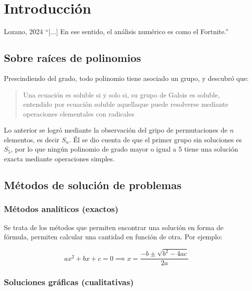 \chapter{Introducción}

\begin{chapquote}{Lozano, 2024}
    ``[...] En ese sentido, el análisis numérico es como el Fortnite.''
\end{chapquote}


\section{Sobre raíces de polinomios}

Prescindiendo del grado, todo polinomio tiene asociado un grupo, y
descubró que:

\begin{quote}
    Una ecuación es soluble si y solo si, su grupo de Galois es soluble,
    entendido por ecuación soluble aquellaque puede resolverse mediante
    operaciones elementales con radicales
\end{quote}

Lo anterior se logró mediante la observación del gripo de permutaciones
de \(n\) elementos, es decir \(S_n\). Él se dio cuenta de que el primer
grupo sin soluciones es \(S_5\), por lo que ningún polinomio de grado
mayor o igual a 5 tiene una solución exacta mediante operaciones
simples.

\section{Métodos de solución de problemas}

\subsection{Métodos analíticos (exactos)}

Se trata de los métodos que permiten encontrar una solución en forma de
fórmula, permiten calcular una cantidad en función de otra. Por ejemplo:

\begin{equation*}{
        ax^2 + bx + c = 0 \implies x = \frac{-b \pm \sqrt{b^2 -4ac}}{2a}
}\end{equation*}

\subsection{Soluciones gráficas (cualitativas)}

